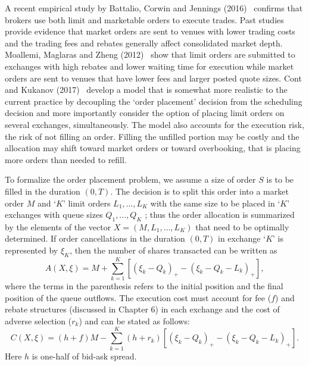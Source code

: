 A recent empirical study by Battalio, Corwin and Jennings (2016)~\cite{} confirms that brokers use both limit and marketable orders to execute trades. Past studies provide evidence that market orders are sent to venues with lower trading costs and the trading fees and rebates generally affect consolidated market depth. Moallemi, Maglaras and Zheng (2012)~\cite{} show that limit orders are submitted to exchanges with high rebates and lower waiting time for execution while market orders are sent to venues that have lower fees and larger posted quote sizes. Cont and Kukanov (2017)~\cite{contk} develop a model that is somewhat more realistic to the current practice by decoupling the `order placement' decision from the scheduling decision and more importantly consider the option of placing limit orders on several exchanges, simultaneously. The model also accounts for the execution risk, the risk of not filling an order. Filling the unfilled portion may be costly and the allocation may shift toward market orders or toward overbooking, that is placing more orders than needed to refill.


To formalize the order placement problem, we assume a size of order $S$ is to be filled in the duration $(0,T)$. The decision is to split this order into a market order $M$ and `$K$' limit orders $L_1,\ldots,L_K$ with the same size to be placed in `$K$' exchanges with queue sizes $Q_1,\ldots,Q_K$ ; thus the order allocation is summarized by the elements of the vector $X=(M,L_1,\ldots,L_K)$ that need to be optimally determined. If order cancellations in the duration $(0,T)$ in exchange `$K$' is represented by $\xi_K$, then the number of shares transacted can be written as 
	\begin{equation}\label{eqn:axe}
	A(X,\xi)= M + \sum_{k=1}^K \left[ (\xi_k - Q_k)_+ - (\xi_k - Q_k - L_k)_+ \right],
	\end{equation}
where the terms in the parenthesis refers to the initial position and the final position of the queue outflows. The execution cost must account for fee ($f$) and rebate structures (discussed in Chapter 6) in each exchange and the cost of adverse selection ($r_k$) and can be stated as follows:
	\begin{equation}\label{eqn:cxe}
	C(X,\xi)= (h+f)M - \sum_{k=1}^K (h+r_k) \left[ (\xi_k - Q_k)_+ - (\xi_k - Q_k - L_k)_+ \right].
	\end{equation}
Here $h$ is one-half of bid-ask spread. 



